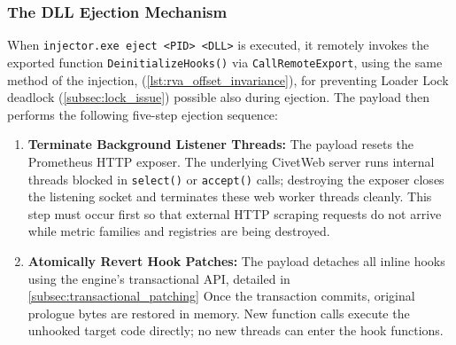 \subsubsection{The DLL Ejection Mechanism}

When \texttt{injector.exe eject <PID> <DLL>} is executed, it remotely invokes the exported function \texttt{DeinitializeHooks()} via \texttt{CallRemoteExport}, using the same method of the injection, (\cref{lst:rva_offset_invariance}), for preventing Loader Lock deadlock (\cref{subsec:lock_issue}) possible also during ejection.
The payload then performs the following five-step ejection sequence:
\begin{enumerate}
	\item \textbf{Terminate Background Listener Threads:}
	The payload resets the Prometheus HTTP exposer.
	The underlying CivetWeb server runs internal threads blocked in \texttt{select()} or \texttt{accept()} calls; destroying the exposer closes the listening socket and terminates these web worker threads cleanly.
	This step must occur first so that external HTTP scraping requests do not arrive while metric families and registries are being destroyed.

	\item \textbf{Atomically Revert Hook Patches:}
	The payload detaches all inline hooks using the engine's transactional API, detailed in \cref{subsec:transactional_patching}
	Once the transaction commits, original prologue bytes are restored in memory.
	New function calls execute the unhooked target code directly; no new threads can enter the hook functions.


\end{enumerate}
